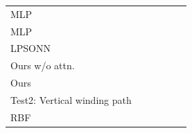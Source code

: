 \documentclass{ieeeaccess}
\begin{document}
\begin{table}[t]
\begin{tabular}{llllllllllll}
		MLP\cite{abdelhadi2013efficient}   &                       &                       &                       &                           &                       &                       &                       &                           &                                           &                                                 &                                                 \\
		MLP\cite{kumar2016localization}    &                       &                       &                       &                           &                       &                       &                       &                           &                                           &                                                 &                                                 \\
		LPSONN\cite{banihashemian2018new}  &                       &                       &                       &                           &                       &                       &                       &                           &                                           &                                                 &                                                 \\
		Ours w/o attn.          &                       &                       &                       &                           &                       &                       &                       &                           &                                           &                                                 &                                                 \\
		Ours                    &                       &                       &                       &                           &                       &                       &                       &                           &                                           &                                                 &                                                 \\
		\midrule
		\multicolumn{12}{l}{Test2: Vertical winding path}                                                                                                                                                                                                                                                                                                                                         \\
		\midrule
		RBF\cite{shareef2008localization}  &                       &                       &                       &                           &                       &                       &                       &                           &                                           &                                                 &                                                 \\

\end{tabular}
\end{table}
\end{document}

